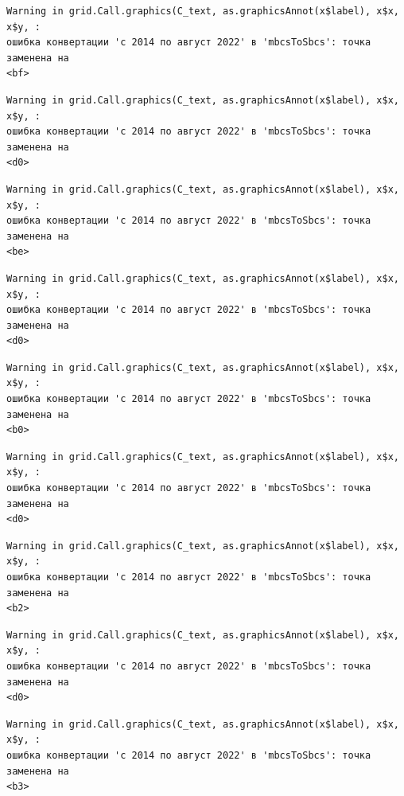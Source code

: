 \documentclass[
  letterpaper,
  DIV=11,
  numbers=noendperiod]{scrreprt}
\begin{document}
\begin{verbatim}
Warning in grid.Call.graphics(C_text, as.graphicsAnnot(x$label), x$x, x$y, :
ошибка конвертации 'с 2014 по август 2022' в 'mbcsToSbcs': точка заменена на
<bf>
\end{verbatim}

\begin{verbatim}
Warning in grid.Call.graphics(C_text, as.graphicsAnnot(x$label), x$x, x$y, :
ошибка конвертации 'с 2014 по август 2022' в 'mbcsToSbcs': точка заменена на
<d0>
\end{verbatim}

\begin{verbatim}
Warning in grid.Call.graphics(C_text, as.graphicsAnnot(x$label), x$x, x$y, :
ошибка конвертации 'с 2014 по август 2022' в 'mbcsToSbcs': точка заменена на
<be>
\end{verbatim}

\begin{verbatim}
Warning in grid.Call.graphics(C_text, as.graphicsAnnot(x$label), x$x, x$y, :
ошибка конвертации 'с 2014 по август 2022' в 'mbcsToSbcs': точка заменена на
<d0>
\end{verbatim}

\begin{verbatim}
Warning in grid.Call.graphics(C_text, as.graphicsAnnot(x$label), x$x, x$y, :
ошибка конвертации 'с 2014 по август 2022' в 'mbcsToSbcs': точка заменена на
<b0>
\end{verbatim}

\begin{verbatim}
Warning in grid.Call.graphics(C_text, as.graphicsAnnot(x$label), x$x, x$y, :
ошибка конвертации 'с 2014 по август 2022' в 'mbcsToSbcs': точка заменена на
<d0>
\end{verbatim}

\begin{verbatim}
Warning in grid.Call.graphics(C_text, as.graphicsAnnot(x$label), x$x, x$y, :
ошибка конвертации 'с 2014 по август 2022' в 'mbcsToSbcs': точка заменена на
<b2>
\end{verbatim}

\begin{verbatim}
Warning in grid.Call.graphics(C_text, as.graphicsAnnot(x$label), x$x, x$y, :
ошибка конвертации 'с 2014 по август 2022' в 'mbcsToSbcs': точка заменена на
<d0>
\end{verbatim}

\begin{verbatim}
Warning in grid.Call.graphics(C_text, as.graphicsAnnot(x$label), x$x, x$y, :
ошибка конвертации 'с 2014 по август 2022' в 'mbcsToSbcs': точка заменена на
<b3>
\end{verbatim}
\end{document}
